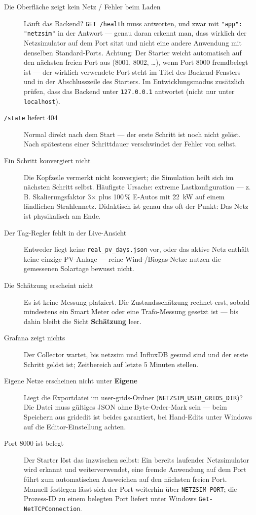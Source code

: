 \documentclass[11pt,a4paper,parskip=half]{scrreprt}
\newcommand{\ui}[1]{\textsf{\bfseries #1}}          %
\newcommand{\api}[1]{\texttt{#1}}                    %
\begin{document}
\begin{description}
  \item[Die Oberfläche zeigt \glqq kein Netz\grqq{} / Fehler beim Laden]
    Läuft das Backend? \api{GET /health} muss antworten, und zwar mit
    \texttt{"app": "netzsim"} in der Antwort --- genau daran erkennt
    man, dass wirklich der Netzsimulator auf dem Port sitzt und nicht
    eine andere Anwendung mit denselben Standard-Ports. Achtung: Der
    Starter weicht automatisch auf den nächsten freien Port aus
    (8001, 8002, …), wenn Port 8000 fremdbelegt ist --- der wirklich
    verwendete Port steht im Titel des Backend-Fensters und in der
    Abschlusszeile des Starters. Im Entwicklungsmodus zusätzlich
    prüfen, dass das Backend unter \texttt{127.0.0.1} antwortet
    (nicht nur unter \texttt{localhost}).
  \item[\api{/state} liefert 404] Normal direkt nach dem Start ---
    der erste Schritt ist noch nicht gelöst. Nach spätestens einer
    Schrittdauer verschwindet der Fehler von selbst.
  \item[Ein Schritt konvergiert nicht] Die Kopfzeile vermerkt
    \glqq nicht konvergiert\grqq; die Simulation heilt sich im
    nächsten Schritt selbst. Häufigste Ursache: extreme
    Lastkonfiguration --- z.\,B. Skalierungsfaktor 3$\times$ plus
    100\,\% E-Autos mit 22~kW auf einem ländlichen Strahlennetz.
    Didaktisch ist genau das oft der Punkt: Das Netz ist
    physikalisch am Ende.
  \item[Der Tag-Regler fehlt in der Live-Ansicht] Entweder liegt
    keine \texttt{real\_pv\_days.json} vor, oder das aktive Netz
    enthält keine einzige PV-Anlage --- reine Wind-/Biogas-Netze
    nutzen die gemessenen Solartage bewusst nicht.
  \item[Die Schätzung erscheint nicht] Es ist keine Messung
    platziert. Die Zustandsschätzung rechnet erst, sobald mindestens
    ein Smart Meter oder eine Trafo-Messung gesetzt ist --- bis
    dahin bleibt die Sicht \ui{Schätzung} leer.
  \item[Grafana zeigt nichts] Der Collector wartet, bis netzsim und
    InfluxDB gesund sind und der erste Schritt gelöst ist;
    Zeitbereich auf \glqq letzte 5 Minuten\grqq{} stellen.
  \item[Eigene Netze erscheinen nicht unter \ui{Eigene}]
    Liegt die Exportdatei im user-grids-Ordner
    (\texttt{NETZSIM\_USER\_GRIDS\_DIR})? Die Datei muss gültiges
    JSON ohne Byte-Order-Mark sein --- beim Speichern aus gridedit
    ist beides garantiert, bei Hand-Edits unter Windows auf die
    Editor-Einstellung achten.
  \item[Port 8000 ist belegt] Der Starter löst das inzwischen
    selbst: Ein bereits laufender Netzsimulator wird erkannt und
    weiterverwendet, eine fremde Anwendung auf dem Port führt zum
    automatischen Ausweichen auf den nächsten freien Port. Manuell
    festlegen lässt sich der Port weiterhin über
    \texttt{NETZSIM\_PORT}; die Prozess-ID zu einem belegten Port
    liefert unter Windows \texttt{Get-Net\allowbreak TCPConnection}.
\end{description}
\end{document}
